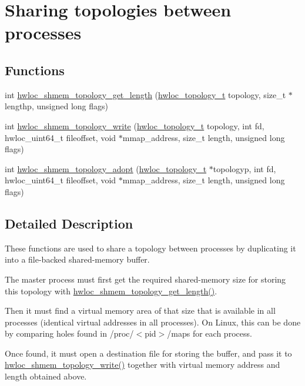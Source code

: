 \hypertarget{a00226}{}\section{Sharing topologies between processes}
\label{a00226}
\subsection*{Functions}
\begin{DoxyCompactItemize}
\item 
int \hyperlink{a00226_ga772ab52750cdd0eec85128df24888001}{hwloc\+\_\+shmem\+\_\+topology\+\_\+get\+\_\+length} (\hyperlink{a00186_ga9d1e76ee15a7dee158b786c30b6a6e38}{hwloc\+\_\+topology\+\_\+t} topology, size\+\_\+t $\ast$lengthp, unsigned long flags)
\item 
int \hyperlink{a00226_ga61b20e346fc76f76420e3a88cc80a671}{hwloc\+\_\+shmem\+\_\+topology\+\_\+write} (\hyperlink{a00186_ga9d1e76ee15a7dee158b786c30b6a6e38}{hwloc\+\_\+topology\+\_\+t} topology, int fd, hwloc\+\_\+uint64\+\_\+t fileoffset, void $\ast$mmap\+\_\+address, size\+\_\+t length, unsigned long flags)
\item 
int \hyperlink{a00226_ga21545bd0f09d9b554c8e60a630e0e629}{hwloc\+\_\+shmem\+\_\+topology\+\_\+adopt} (\hyperlink{a00186_ga9d1e76ee15a7dee158b786c30b6a6e38}{hwloc\+\_\+topology\+\_\+t} $\ast$topologyp, int fd, hwloc\+\_\+uint64\+\_\+t fileoffset, void $\ast$mmap\+\_\+address, size\+\_\+t length, unsigned long flags)
\end{DoxyCompactItemize}


\subsection{Detailed Description}
These functions are used to share a topology between processes by duplicating it into a file-\/backed shared-\/memory buffer.

The master process must first get the required shared-\/memory size for storing this topology with \hyperlink{a00226_ga772ab52750cdd0eec85128df24888001}{hwloc\+\_\+shmem\+\_\+topology\+\_\+get\+\_\+length()}.

Then it must find a virtual memory area of that size that is available in all processes (identical virtual addresses in all processes). On Linux, this can be done by comparing holes found in /proc/$<$pid$>$/maps for each process.

Once found, it must open a destination file for storing the buffer, and pass it to \hyperlink{a00226_ga61b20e346fc76f76420e3a88cc80a671}{hwloc\+\_\+shmem\+\_\+topology\+\_\+write()} together with virtual memory address and length obtained above.


